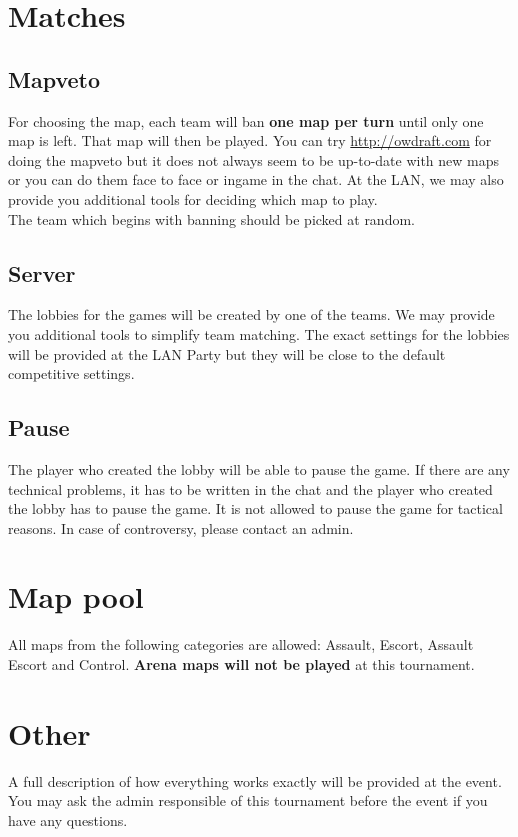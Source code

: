 \documentclass{article}
\begin{document}
	\section{Matches}
	\subsection{Mapveto}
	For choosing the map, each team will ban \textbf{one map per turn} until only one map is left. That map will then be played.
	You can try \url{http://owdraft.com} for doing the mapveto but it does not always seem to be up-to-date with new maps
	or you can do them face to face or ingame in the chat. At the LAN, we may also provide you additional tools
	for deciding which map to play. \\
	The team which begins with banning should be picked at random.
	
	\subsection{Server}
	The lobbies for the games will be created by one of the teams. We may provide you additional tools to simplify team matching. The exact settings for the lobbies will be provided at the LAN Party but they will be close to the default competitive settings.
	
	\subsection{Pause}
	The player who created the lobby will be able to pause the game. If there are any technical problems, it has to be written in the chat and the player who created the lobby has to pause the game. It is not allowed to pause the game for tactical reasons. In case of controversy, please contact an admin.
	
	\section{Map pool}
	All maps from the following categories are allowed: Assault, Escort, Assault Escort and Control.
	\textbf{Arena maps will not be played} at this tournament.
	
	\section{Other}
	A full description of how everything works exactly will be provided at the event. You may ask the admin responsible of this tournament before the event if you have any questions.
	
\end{document}

